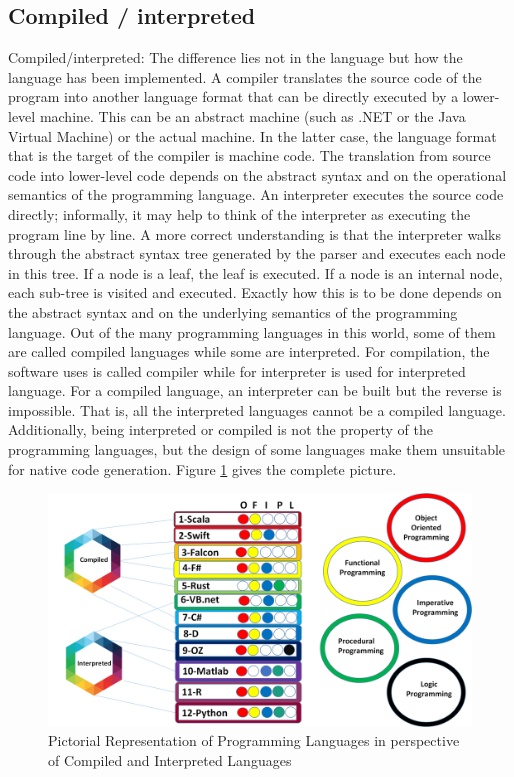 \documentclass{sig-alternate}
\begin{document}
	\subsection{Compiled / interpreted}
	Compiled/interpreted: The difference lies not in the language but how the language has been implemented. A compiler translates the source code of the program into another language format that can be directly executed by a lower-level machine. This can be an abstract machine (such as .NET or the Java Virtual Machine) or the actual machine. In the latter case, the language format that is the target of the compiler is machine code. The translation from source code into lower-level code depends on the abstract syntax and on the operational semantics of the programming language. An interpreter executes the source code directly; informally, it may help to think of the interpreter as executing the program line by line. A more correct understanding is that the interpreter walks through the abstract syntax tree generated by the parser and executes each node in this tree. If a node is a leaf, the leaf is executed. If a node is an internal node, each sub-tree is visited and executed. Exactly how this is to be done depends on the abstract syntax and on the underlying semantics of the programming language.
	Out of the many programming languages in this world, some of them are called compiled languages while some are interpreted. For compilation, the software uses is called compiler while for interpreter is used for interpreted language. For a compiled language, an interpreter can be built but the reverse is impossible. That is, all the interpreted languages cannot be a compiled language. Additionally, being interpreted or compiled is not the property of the programming languages, but the design of some languages make them unsuitable for native code generation. Figure \ref{fig:compiledInterpreted} gives the complete picture.\\
\begin{figure}
  \includegraphics[width=\linewidth]{compiledInterpreted.png}
  \caption{Pictorial Representation of Programming Languages in perspective of Compiled and Interpreted Languages}
	\label{fig:compiledInterpreted}
\end{figure}
\end{document}
